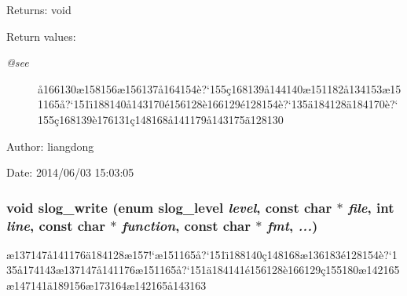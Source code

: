 \begin{Desc}
\item[Returns:]void \end{Desc}
\begin{Desc}
\item[Return values:]
\begin{description}
\item[{\em @see}]\aa{}166130\ae{}158156\ae{}156137\aa{}164154\`{e}?`155\c{c}168139\aa{}144140\ae{}151182\aa{}134153\ae{}151165\aa{}?`151\"{\i}188140\aa{}143170\'{e}156128\`{e}166129\'{e}128154\`{e}?`135\"{a}184128\"{a}184170\`{e}?`155\c{c}168139\`{e}176131\c{c}148168\aa{}141179\aa{}143175\~{a}128130 \end{description}
\end{Desc}
\begin{Desc}
\item[Author:]liangdong \end{Desc}
\begin{Desc}
\item[Date:]2014/06/03 15:03:05 \end{Desc}
\subsubsection{\setlength{\rightskip}{0pt plus 5cm}void slog\_\-write (enum slog\_\-level {\em level}, const char $\ast$ {\em file}, int {\em line}, const char $\ast$ {\em function}, const char $\ast$ {\em fmt},  {\em ...})}\label{slog_8c_a10}


\ae{}137147\aa{}141176\"{a}184128\ae{}157!`\ae{}151165\aa{}?`151\"{\i}188140\c{c}148168\ae{}136183\'{e}128154\`{e}?`135\aa{}174143\ae{}137147\aa{}141176\ae{}151165\aa{}?`151\"{a}184141\'{e}156128\`{e}166129\c{c}155180\ae{}142165\ae{}147141\"{a}189156\ae{}173164\ae{}142165\aa{}143163 

